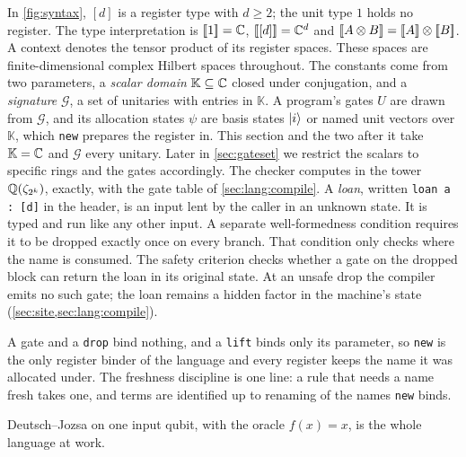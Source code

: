\documentclass[acmsmall,screen,review,anonymous,nonacm]{acmart}
\begin{document}
In \cref{fig:syntax}, $[d]$ is a register type with $d\ge2$; the unit type $1$ holds no register.
The type interpretation is $[\![1]\!]=\mathbb{C}$, $[\![[d]]\!]=\mathbb{C}^d$ and
$[\![A\otimes B]\!]=[\![A]\!]\otimes[\![B]\!]$. A context denotes the tensor
product of its register spaces. These spaces are finite-dimensional
complex Hilbert spaces throughout.
The constants come from two parameters, a
\emph{scalar domain} $\mathbb{K} \subseteq \mathbb{C}$ closed under conjugation,
and a \emph{signature} $\mathcal{G}$, a set of unitaries with entries in
$\mathbb{K}$. A program's gates $U$ are drawn from $\mathcal G$, and its
allocation states $\psi$ are basis states $\lvert i \rangle$ or named unit
vectors over $\mathbb{K}$, which \texttt{new} prepares the register in.
This section and the two after it take $\mathbb{K} = \mathbb{C}$ and
$\mathcal{G}$ every unitary. Later in \cref{sec:gateset} we restrict
the scalars to specific rings and the gates accordingly. The checker computes in the tower
$\mathbb{Q}(\zeta_{2^k})$, exactly, with the gate table of
\cref{sec:lang:compile}. A \emph{loan}, written
\texttt{loan a : [d]} in the header, is an input lent by the caller in an
unknown state. It is typed and run like any other input. A separate
well-formedness condition requires it to be dropped exactly once on every
branch. That condition only checks where the name is consumed.
The safety criterion checks whether a gate on the dropped block can return
the loan in its original state. At an unsafe drop the compiler emits no
such gate; the loan remains a hidden factor in the machine's state
(\cref{sec:site,sec:lang:compile}).

A gate and a \texttt{drop} bind nothing, and a \texttt{lift} binds only its
parameter, so \texttt{new} is the only register binder of the language and every register
keeps the name it was allocated under. The
freshness discipline is one line: a rule that needs a name fresh takes one, and
terms are identified up to renaming of the names \texttt{new} binds.

Deutsch--Jozsa on one input qubit, with the oracle $f(x) = x$, is the whole
language at work.
\end{document}
